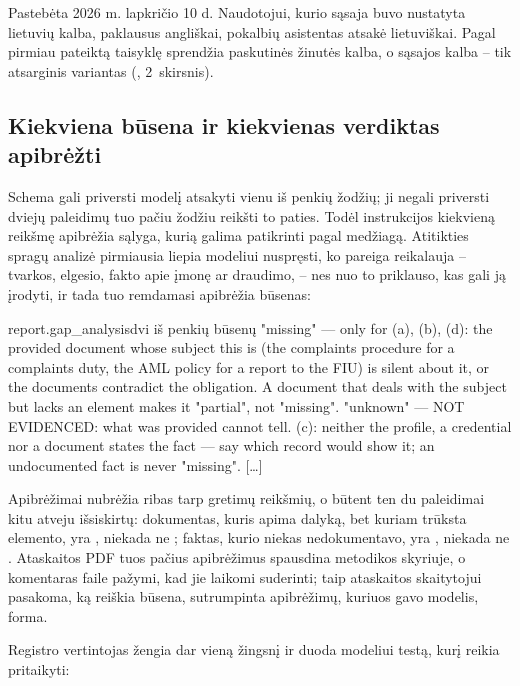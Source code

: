 \begin{lessonbox}{Pastebėta 2026 m. lapkričio 10 d.}
Naudotojui, kurio sąsaja buvo nustatyta lietuvių kalba, paklausus angliškai, pokalbių
asistentas atsakė lietuviškai. Pagal pirmiau pateiktą taisyklę sprendžia paskutinės žinutės
kalba, o sąsajos kalba -- tik atsarginis variantas (,
2~skirsnis).
\end{lessonbox}

\subsection{Kiekviena būsena ir kiekvienas verdiktas apibrėžti}

Schema gali priversti modelį atsakyti vienu iš penkių žodžių; ji negali priversti dviejų
paleidimų tuo pačiu žodžiu reikšti to paties. Todėl instrukcijos kiekvieną reikšmę apibrėžia
sąlyga, kurią galima patikrinti pagal medžiagą. Atitikties spragų analizė pirmiausia liepia
modeliui nuspręsti, ko pareiga reikalauja -- tvarkos, elgesio, fakto apie įmonę ar draudimo, --
nes nuo to priklauso, kas gali ją įrodyti, ir tada tuo remdamasi apibrėžia būsenas:

\begin{promptexcerpt}{report.gap_analysis}{dvi iš penkių būsenų}
"missing" — only for (a), (b), (d): the provided document whose subject this is
  (the complaints procedure for a complaints duty, the AML policy for a report to
  the FIU) is silent about it, or the documents contradict the obligation. A
  document that deals with the subject but lacks an element makes it "partial",
  not "missing".
"unknown" — NOT EVIDENCED: what was provided cannot tell. (c): neither the
  profile, a credential nor a document states the fact — say which record would
  show it; an undocumented fact is never "missing".
[…]
\end{promptexcerpt}

Apibrėžimai nubrėžia ribas tarp gretimų reikšmių, o būtent ten du paleidimai kitu atveju
išsiskirtų: dokumentas, kuris apima dalyką, bet kuriam trūksta elemento, yra ,
niekada ne ; faktas, kurio niekas nedokumentavo, yra , niekada
ne . Ataskaitos PDF tuos pačius apibrėžimus spausdina metodikos skyriuje, o
komentaras faile  pažymi, kad jie laikomi suderinti; taip ataskaitos
skaitytojui pasakoma, ką reiškia būsena, sutrumpinta apibrėžimų, kuriuos gavo modelis, forma.

Registro vertintojas žengia dar vieną žingsnį ir duoda modeliui testą, kurį reikia pritaikyti:

